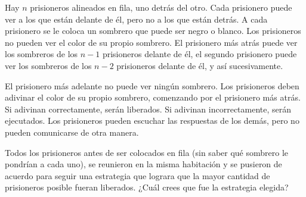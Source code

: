 Hay $n$ prisioneros alineados en fila, uno detrás del otro. Cada prisionero puede ver a los que están delante de él, pero no a los que están detrás. A cada prisionero se le coloca un sombrero que puede ser negro o blanco. Los prisioneros no pueden ver el color de su propio sombrero. El prisionero más atrás puede ver los sombreros de los $n-1$ prisioneros delante de él, el segundo prisionero puede ver los sombreros de los $n-2$ prisioneros delante de él, y así sucesivamente.

El prisionero más adelante no puede ver ningún sombrero. Los prisioneros deben adivinar el color de su propio sombrero, comenzando por el prisionero más atrás. Si adivinan correctamente, serán liberados. Si adivinan incorrectamente, serán ejecutados. Los prisioneros pueden escuchar las respuestas de los demás, pero no pueden comunicarse de otra manera. 

Todos los prisioneros antes de ser colocados en fila (sin saber qué sombrero le pondrían a cada uno), se reunieron en la misma habitación y se pusieron de acuerdo para seguir una estrategia que lograra que la mayor cantidad de prisioneros posible fueran liberados. ¿Cuál crees que fue la estrategia elegida? 